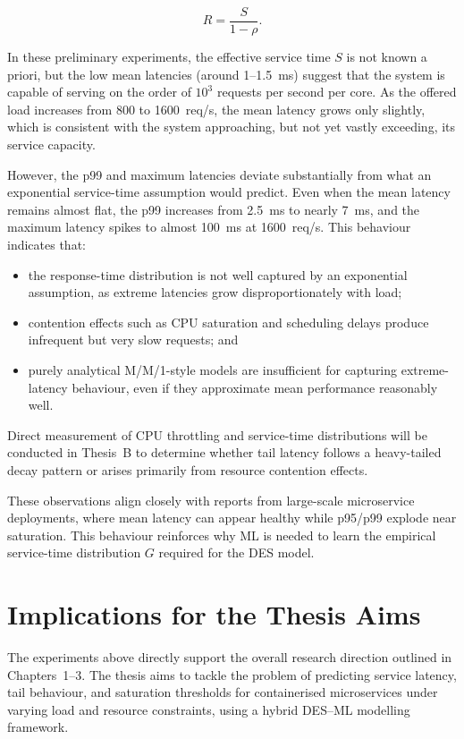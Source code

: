 \[
  R = \frac{S}{1 - \rho}.
\]

In these preliminary experiments, the effective service time $S$ is not
known a priori, but the low mean latencies (around 1--1.5~ms) suggest
that the system is capable of serving on the order of $10^3$ requests
per second per core. As the offered load increases from 800 to
1600~req/s, the mean latency grows only slightly, which is consistent
with the system approaching, but not yet vastly exceeding, its service
capacity.

However, the p99 and maximum latencies deviate substantially from what an
exponential service-time assumption would predict. Even when the mean
latency remains almost flat, the p99 increases from 2.5~ms to nearly
7~ms, and the maximum latency spikes to almost 100~ms at 1600~req/s.
This behaviour indicates that:

\begin{itemize}
    \item the response-time distribution is not well captured by an exponential
          assumption, as extreme latencies grow disproportionately with load;
    \item contention effects such as CPU saturation and scheduling delays
          produce infrequent but very slow requests; and
    \item purely analytical M/M/1-style models are insufficient for capturing
          extreme-latency behaviour, even if they approximate mean performance
          reasonably well.
\end{itemize}

Direct measurement of CPU throttling and service-time distributions will be
conducted in Thesis~B to determine whether tail latency follows a heavy-tailed
decay pattern or arises primarily from resource contention effects.

These observations align closely with reports from large-scale microservice
deployments, where mean latency can appear healthy while p95/p99 explode near
saturation. This behaviour reinforces why ML is needed to learn the empirical
service-time distribution \(G\) required for the DES model.


\section{Implications for the Thesis Aims}
\label{sec:prelim-implications}

The experiments above directly support the overall research direction
outlined in Chapters~1--3. The thesis aims to tackle the problem of
predicting service latency, tail behaviour, and saturation thresholds
for containerised microservices under varying load and resource
constraints, using a hybrid DES--ML modelling framework.

